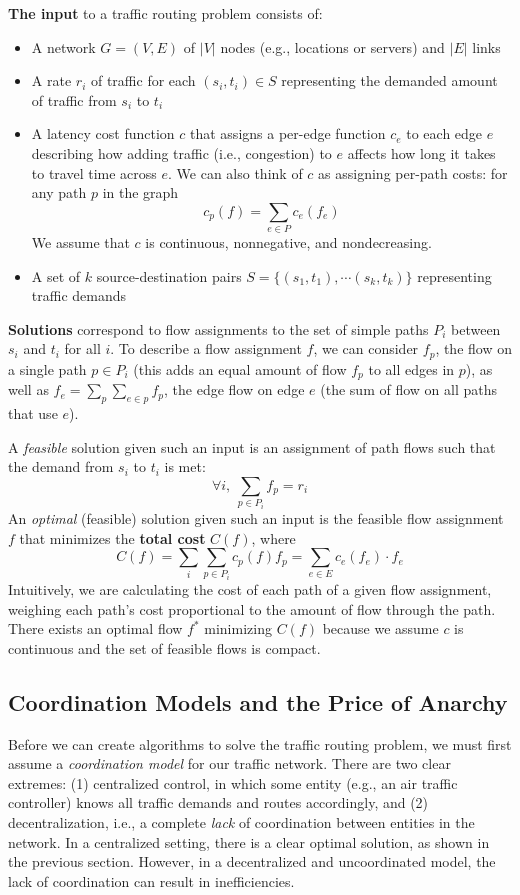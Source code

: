 \documentclass[acmlarge]{acmart}
\begin{document}
\medskip\noindent
\textbf{The input} to a traffic routing problem consists of:
\begin{itemize}
    \item A network $G = (V, E)$ of $|V|$ nodes (e.g., locations or servers) and $|E|$ links 
    \item A {rate} $r_i$ of traffic for each $(s_i,t_i)\in S$ representing the demanded amount of traffic from $s_i$ to $t_i$
    \item A {latency} cost function $c$ that assigns a per-edge function $c_e$ to each edge $e$ describing how adding traffic (i.e., congestion) to $e$ affects how long it takes to travel time across $e$. We can also think of $c$ as assigning per-path costs: for any path $p$ in the graph
        $$c_p(f) = \sum_{e\in P}c_e(f_e)$$ 
        We assume that $c$ is continuous, nonnegative, and nondecreasing.
    \item A set of $k$ source-destination pairs $S=\{(s_1,t_1), \cdots (s_k,t_k)\}$ representing traffic demands
\end{itemize}

\medskip\noindent
\textbf{Solutions} correspond to flow assignments to the set of simple paths $P_i$ between $s_i$ and $t_i$ for all $i$. To describe a flow assignment $f$, we can consider $f_p$, the flow on a single path $p \in P_i$ (this adds an equal amount of flow $f_p$ to all edges in $p$), as well as $f_e = \sum_p \sum_{e\in p} f_p$, the edge flow on edge $e$ (the sum of flow on all paths that use $e$).

   A \emph{feasible} solution given such an input is an assignment of path flows such that the demand from $s_i$ to $t_i$ is met:
$$\forall i,~\sum_{p\in P_i} f_p = r_i$$
   An \emph{optimal} (feasible) solution given such an input is the feasible flow assignment $f$ that minimizes the \textbf{total cost} $C(f)$, where
$$C(f) = \sum_i\sum_{p\in P_i}c_p(f)f_p = \sum_{e\in E} c_e(f_e)\cdot f_e$$
Intuitively, we are calculating the cost of each path of a given flow assignment, weighing 
each path's cost proportional to the amount of flow through the path.
There exists an optimal flow $f^*$ minimizing $C(f)$ because we assume $c$ is continuous and the set of feasible flows is compact.

\subsection{Coordination Models and the Price of Anarchy}
Before we can create algorithms to solve the traffic routing problem, we must first assume a \emph{coordination model} for our traffic network.
There are two clear extremes: (1) centralized control, in which some entity (e.g., an air traffic controller) knows all traffic demands and routes accordingly, and
(2) decentralization, i.e., a complete \emph{lack} of coordination between
entities in the network.
In a centralized setting, there is a clear optimal solution, as shown in the previous section.
However, in a decentralized and uncoordinated model, the lack of coordination can result in
inefficiencies. 
\end{document}
